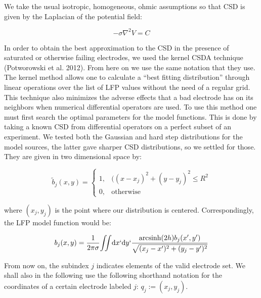 \documentclass{article}
\newcommand{\rd}{\mathrm{d}}
\DeclareMathOperator{\arcsinh}{arcsinh}
\begin{document}
 We take the usual isotropic, homogeneous, ohmic assumptions so that CSD is given by the Laplacian of the potential field:

 \begin{equation}
-\sigma \nabla^2 V =C
 \end{equation}
 

In order to obtain the best approximation to the CSD in the presence of saturated or otherwise failing electrodes, we used the kernel CSDA technique (Potworowski et al. 2012). From here on we use the same notation that they use.  The kernel method allows one to calculate a ``best fitting distribution'' through linear operations over the list of LFP values without the need of a regular grid. This technique also minimizes the adverse effects that a bad electrode has on its neighbors when numerical differential operators are used. To use this method one must first search the optimal parameters for the model functions. This is done by taking a known CSD from differential operators on a perfect subset of an experiment. We tested both the Gaussian and hard step distributions for the model sources, the latter gave sharper CSD distributions, so we settled for those. They are given in two dimensional space by:

\begin{equation}
  \tilde{b}_j(x,y)=
  \begin{cases}
    1, & ((x-x_j)^2+(y-y_j)^2 \leq R^2 \\
    0, & \mbox{otherwise}
    \end{cases}
\end{equation}               

where $(x_j,y_j)$ is the point where our distribution is centered. 
Correspondingly, the LFP model function would be:

\begin{equation}
  b_j(x,y)=\frac{1}{2\pi\sigma}{\iint} \rd x`\rd y`
  \frac{\arcsinh(2h)b_j(x',y')}{\sqrt{(x_j-x')^2+(y_j-y')^2}}
 \end{equation}               

From now on, the subindex $j$ indicates elements of the valid electrode set. We shall also in the following use the following shorthand notation for the coordinates of a certain electrode labeled $j$: $q_j:=(x_j,y_j)$.
 
\end{document}
